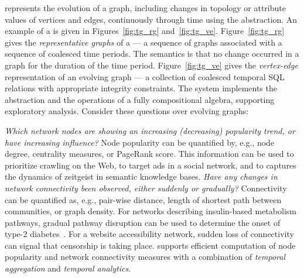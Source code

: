 \ql represents the evolution of a graph, including changes in topology 
or attribute values of vertices and edges, continuously through time
using the \tg abstraction.  An example of a \tg is given in
Figures~\ref{fig:tg_rg} and~\ref{fig:tg_ve}.  Figure~\ref{fig:tg_rg} gives the
{\em representative graphs} of a \tg --- a sequence of
graphs associated with a sequence of coalesced time periods.  The semantics
is that no change occurred in a graph for the duration of
the time period. Figure~\ref{fig:tg_ve} gives the {\em vertex-edge}
representation of an evolving graph --- a collection of coalesced
temporal SQL relations with appropriate integrity constraints.
The \ql system implements the \tg abstraction and the operations of a
fully compositional algebra, supporting exploratory analysis. 
Consider these questions over evolving graphs:

%

{\em Which network nodes are showing an increasing (decreasing) popularity trend,
  or have increasing influence?}
Node popularity can be quantified by, e.g., node degree, centrality measures,
or PageRank score.  This information can be used to prioritize
crawling on the Web, to target ads in a social network, and to
captures the dynamics of zeitgeist in semantic knowledge bases.
%
{\em Have any changes in network connectivity been observed, either
  suddenly or gradually?} Connectivity can be quantified as,
e.g., pair-wise distance, length of shortest path between communities,
or graph density.  For networks describing insulin-based metabolism
pathways, gradual pathway disruption can be used to determine the
onset of type-2 diabetes~\cite{DBLP:journals/tcsb/BeyerTLSF10}.  For a
website accessibility network, sudden loss of connectivity can signal
that censorship is taking place.
%
\ql supports efficient computation of node popularity and network
connectivity measures with a combination of {\em temporal aggregation}
and {\em temporal analytics}.

